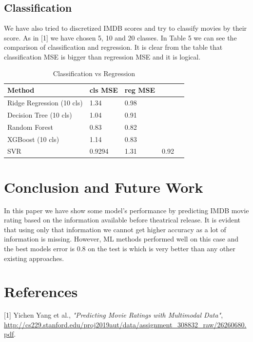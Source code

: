 \documentclass{article}
\begin{document}
\subsection{Classification}
We have also tried to discretized IMDB scores and try to classify movies by their score. As in [1] we have chosen 5, 10  and 20 classes. In Table 5 we can see the comparison of classification and regression. It is clear from the table that classification MSE is bigger than regression MSE and it is logical. 

\begin{table}
  \caption{Classification vs Regression}
  \label{cls_vs_reg}
  \centering
  \begin{tabular}{lllll}
    \toprule
    Method & cls MSE & reg MSE   \\
    \midrule
    Ridge Regression (10 cls) & 1.34 & 0.98    \\
    Decision Tree (10 cls) & 1.04 & 0.91 \\
    Random Forest & 0.83 & 0.82 \\
    XGBoost (10 cls) & 1.14 & 0.83 \\
    SVR & 0.9294 & 1.31 &  0.92 \\
        \bottomrule
  \end{tabular}
\end{table}



\section{Conclusion and Future Work}

In this paper we have show some model's performance by predicting IMDB movie rating based on the information available before theatrical release. It is evident that using only that information we cannot get higher accuracy as a lot of information is missing. However, ML methods performed well on this case and the best models error is 0.8 on the test is which is very better than any other existing approaches. 

\section*{References}
\label{reference}

\small

[1] Yichen Yang et al., {\it "Predicting Movie Ratings with Multimodal Data"},
\url{http://cs229.stanford.edu/proj2019aut/data/assignment_308832_raw/26260680.pdf}.
\end{document}
